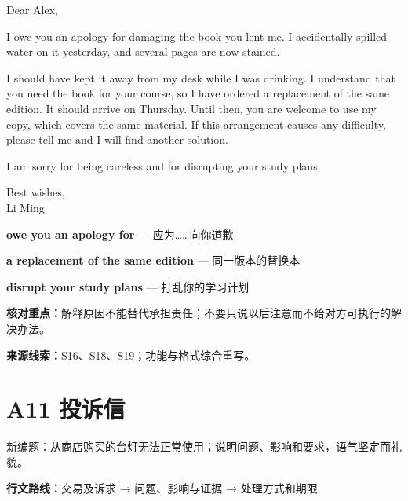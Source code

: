 \documentclass[11pt,a4paper,fontset=macnew]{ctexart}
\newenvironment{example}{\begingroup\fontsize{11}{14.3}\selectfont\setlength{\parskip}{4pt}}{\par\endgroup}
\begin{document}
\begin{example}
\noindent Dear Alex,\par
I owe you an apology for damaging the book you lent me. I accidentally spilled water on it yesterday, and several pages are now stained.

I should have kept it away from my desk while I was drinking. I understand that you need the book for your course, so I have ordered a replacement of the same edition. It should arrive on Thursday. Until then, you are welcome to use my copy, which covers the same material. If this arrangement causes any difficulty, please tell me and I will find another solution.

I am sorry for being careless and for disrupting your study plans.

\noindent Best wishes,\\Li Ming\par
\end{example}
\par\vspace{4pt}{\bfseries 好词好句：优先记这三处}\par\nopagebreak
{\small\textbf{owe you an apology for} — 应为……向你道歉}\par
{\small\textbf{a replacement of the same edition} — 同一版本的替换本}\par
{\small\textbf{disrupt your study plans} — 打乱你的学习计划}\par
{\small\textbf{核对重点：}解释原因不能替代承担责任；不要只说以后注意而不给对方可执行的解决办法。}\par
{\fontsize{8}{10}\selectfont\textbf{来源线索：}S16、S18、S19；功能与格式综合重写。}\par
\clearpage\section*{A11  投诉信}
{\small 新编题：从商店购买的台灯无法正常使用；说明问题、影响和要求，语气坚定而礼貌。}\par
{\small\textbf{行文路线：}交易及诉求 → 问题、影响与证据 → 处理方式和期限}\par
\par\vspace{4pt}{\bfseries 可替换模板}\par\nopagebreak
\end{document}
